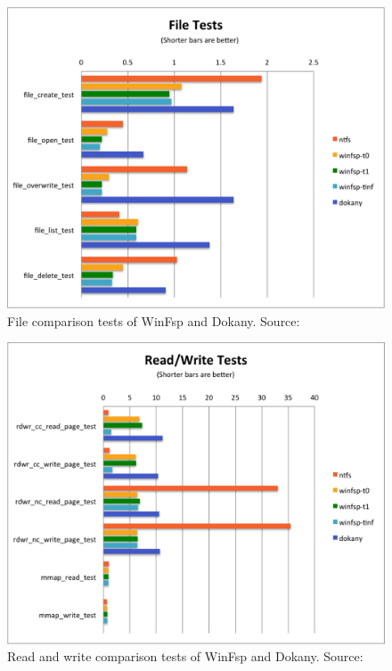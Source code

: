 \begin{figure}[htb]
	\centering
	\includegraphics[width=\columnwidth]{obrazky-figures/file_tests.pdf}
	\caption{File comparison tests of WinFsp and Dokany. Source:\cite{GitWinFsp}}
	\label{winfsp_file_tests}
\end{figure}

\begin{figure}[htb]
	\centering
	\includegraphics[width=\columnwidth]{obrazky-figures/rdwr_tests.pdf}
	\caption{Read and write comparison tests of WinFsp and Dokany. Source:\cite{GitWinFsp}}
	\label{winfsp_rdwr_tests}
\end{figure}

